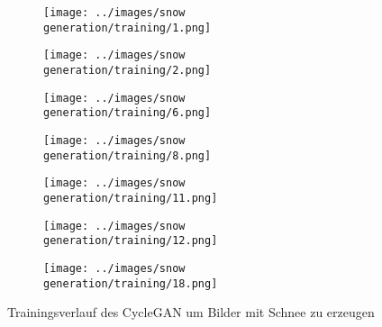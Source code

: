 
\begin{figure}[H]
	\centering
  \captionsetup[subfigure]{labelformat=empty}
	\begin{subfigure}[b]{0.125\textwidth}
		 \centering
		 \texttt{[image: ../images/snow generation/training/1.png]}
	\end{subfigure}
	\hspace{0.5em}%
	\begin{subfigure}[b]{0.125\textwidth}
		 \centering
		 \texttt{[image: ../images/snow generation/training/2.png]}
	\end{subfigure}
	\hspace{0.5em}%
	\begin{subfigure}[b]{0.125\textwidth}
		 \centering
		 \texttt{[image: ../images/snow generation/training/6.png]}
	\end{subfigure}
	\hspace{0.5em}%
	\begin{subfigure}[b]{0.125\textwidth}
	 \centering
	 \texttt{[image: ../images/snow generation/training/8.png]}
  \end{subfigure}
  \hspace{0.5em}%
  \begin{subfigure}[b]{0.125\textwidth}
	\centering
	\texttt{[image: ../images/snow generation/training/11.png]}
	\end{subfigure}
	\hspace{0.5em}%
	\begin{subfigure}[b]{0.125\textwidth}
		\centering
		\texttt{[image: ../images/snow generation/training/12.png]}
	\end{subfigure}
	\hspace{0.5em}%
	\begin{subfigure}[b]{0.125\textwidth}
		\centering
		\texttt{[image: ../images/snow generation/training/18.png]}
	\end{subfigure}
 \caption{Trainingsverlauf des \ac{CycleGAN} um Bilder mit Schnee zu erzeugen}
 \label{fig:snow-imgs}
 \end{figure}
 
